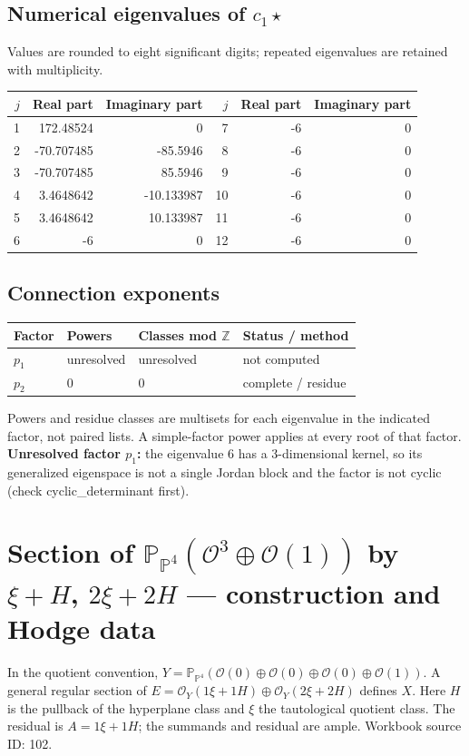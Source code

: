 \documentclass[10pt,a4paper]{article}
\begin{document}
\subsection*{Numerical eigenvalues of $c_1\star$}
Values are rounded to eight significant digits; repeated eigenvalues are retained with multiplicity.
\begin{center}\small\begin{tabular}{rrr@{\qquad}rrr}\toprule $j$ & Real part & Imaginary part & $j$ & Real part & Imaginary part\\\midrule
1 & 172.48524 & 0 & 7 & -6 & 0\\
2 & -70.707485 & -85.5946 & 8 & -6 & 0\\
3 & -70.707485 & 85.5946 & 9 & -6 & 0\\
4 & 3.4648642 & -10.133987 & 10 & -6 & 0\\
5 & 3.4648642 & 10.133987 & 11 & -6 & 0\\
6 & -6 & 0 & 12 & -6 & 0\\
\bottomrule\end{tabular}\end{center}
\subsection*{Connection exponents}
\begin{center}\begin{tabular}{llll}\toprule Factor & Powers & Classes mod $\mathbb Z$ & Status / method\\\midrule
$p_{1}$ & unresolved & unresolved & not computed\\
$p_{2}$ & $0$ & $0$ & complete / residue\\
\bottomrule\end{tabular}\end{center}
Powers and residue classes are multisets for each eigenvalue in the indicated factor, not paired lists. A simple-factor power applies at every root of that factor.
\textbf{Unresolved factor $p_{1}$:} the eigenvalue 6 has a 3-dimensional kernel, so its generalized eigenspace is not a single Jordan block and the factor is not cyclic (check cyclic\_determinant first).
\clearpage\section*{Section of $\mathbb P_{\mathbb P^{4}}(\mathcal O^{3}\oplus \mathcal O(1))$ by $\xi +H$, $2\xi +2H$ --- construction and Hodge data}\label{entry:PB5-102}
In the quotient convention, $Y=\mathbb P_{\mathbb P^{4}}(\mathcal O(0)\oplus\mathcal O(0)\oplus\mathcal O(0)\oplus\mathcal O(1))$.
A general regular section of $E=\mathcal O_Y(1\xi+1H)\oplus\mathcal O_Y(2\xi+2H)$ defines $X$.
Here $H$ is the pullback of the hyperplane class and $\xi$ the tautological quotient class. The residual is $A=1\xi+1H$; the summands and residual are ample.
Workbook source ID: 102.
\end{document}
